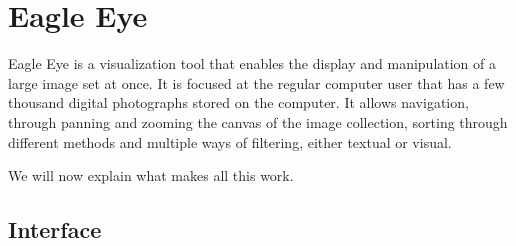 \chapter{Eagle Eye}
\label{cha:eagle_eye}


Eagle Eye is a visualization tool that enables the display and manipulation of a large image set at once. It is focused at the regular computer user that has a few thousand digital photographs stored on the computer. It allows navigation, through panning and zooming the canvas of the image collection, sorting through different methods and multiple ways of filtering, either textual or visual.

We will now explain what makes all this work.













\section{Interface} %
\label{sec:interface}



\cleardoublepage